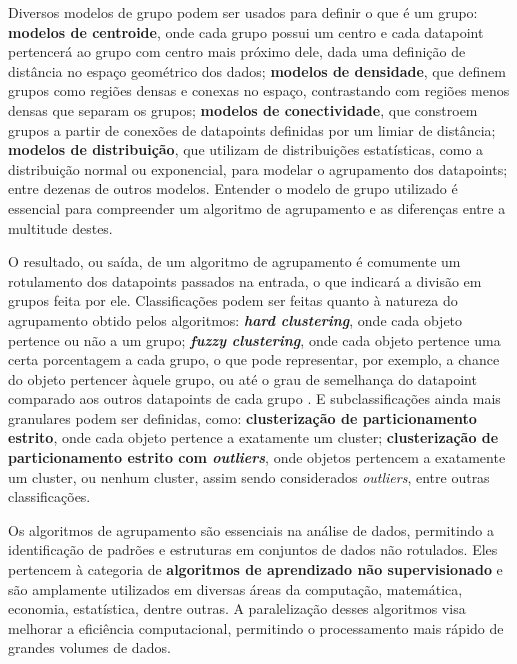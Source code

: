 \documentclass[12pt, %
openright, 
oneside, %
a4paper,    %
brazil]{facom-ufu-abntex2}
\begin{document}


Diversos modelos de grupo podem ser usados para definir o que é um grupo: \textbf{modelos de centroide}, onde cada grupo possui um centro e cada datapoint pertencerá ao grupo com centro mais próximo dele, dada uma definição de distância no espaço geométrico dos dados; \textbf{modelos de densidade}, que definem grupos como regiões densas e conexas no espaço, contrastando com regiões menos densas que separam os grupos; \textbf{modelos de conectividade}, que constroem grupos a partir de conexões de datapoints definidas por um limiar de distância; \textbf{modelos de distribuição}, que utilizam de distribuições estatísticas, como a distribuição normal ou exponencial, para modelar o agrupamento dos datapoints; entre dezenas de outros modelos. Entender o modelo de grupo utilizado é essencial para compreender um algoritmo de agrupamento e as diferenças entre a multitude destes.

O resultado, ou saída, de um algoritmo de agrupamento é comumente um rotulamento dos datapoints passados na entrada, o que indicará a divisão em grupos feita por ele. Classificações podem ser feitas quanto à natureza do agrupamento obtido pelos algoritmos: \textbf{\textit{hard clustering}}, onde cada objeto pertence ou não a um grupo; \textbf{\textit{fuzzy clustering}}, onde cada objeto pertence uma certa porcentagem a cada grupo, o que pode representar, por exemplo, a chance do objeto pertencer àquele grupo, ou até o grau de semelhança do datapoint comparado aos outros datapoints de cada grupo \cite{FuzzyClusteringSurvey}. E subclassificações ainda mais granulares podem ser definidas, como: \textbf{clusterização de particionamento estrito}, onde cada objeto pertence a exatamente um cluster; \textbf{clusterização de particionamento estrito com \textit{outliers}}, onde objetos pertencem a exatamente um cluster, ou nenhum cluster, assim sendo considerados \textit{outliers}, entre outras classificações.

Os algoritmos de agrupamento são essenciais na análise de dados, permitindo a identificação de padrões e estruturas em conjuntos de dados não rotulados. Eles pertencem à categoria de \textbf{algoritmos de aprendizado não supervisionado} e são amplamente utilizados em diversas áreas da computação, matemática, economia, estatística, dentre outras. A paralelização desses algoritmos visa melhorar a eficiência computacional, permitindo o processamento mais rápido de grandes volumes de dados.
\end{document}
